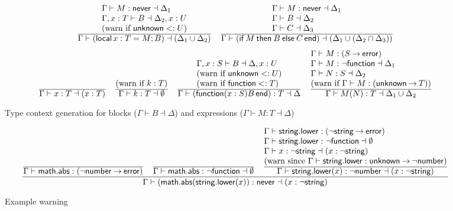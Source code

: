 \documentclass[sigplan]{acmart}
\makeatletter
\newcommand{\infer}[2]{\frac{\displaystyle\begin{array}{@{}l@{}}#1\end{array}}{\displaystyle#2}}
\newcommand{\LOCAL}{\mathop{\mathsf{local}}}
\newcommand{\FUNCTION}{\mathop{\mathsf{function}}}
\newcommand{\IF}{\mathop{\mathsf{if}}}
\newcommand{\THEN}{\mathbin{\mathsf{then}}}
\newcommand{\ELSE}{\mathbin{\mathsf{else}}}
\newcommand{\END}{\mathop{\mathsf{end}}}
\newcommand{\NEVER}{\mathsf{never}}
\newcommand{\ERROR}{\mathsf{error}}
\newcommand{\UNKNOWN}{\mathsf{unknown}}
\newcommand{\STRING}{\mathsf{string}}
\newcommand{\NUMBER}{\mathsf{number}}
\newcommand{\MATH}{\mathsf{math}}
\newcommand{\ABS}{\mathsf{abs}}
\newcommand{\LOWER}{\mathsf{lower}}
\newcommand{\fun}{\mathbin{\rightarrow}}
\makeatother
\begin{document}
\begin{figure}
  \[\begin{array}{c}
    \infer{
      \Gamma \vdash M : \NEVER \dashv \Delta_1 \\
      \Gamma, x : T \vdash B \dashv \Delta_2, x : U \\
      \mbox{(warn if $\UNKNOWN <: U$)}
    }{
      \Gamma \vdash (\LOCAL x : T = M; B) \dashv (\Delta_1 \cup \Delta_2)
    }
    \quad
    \infer{
      \Gamma \vdash M : \NEVER \dashv \Delta_1 \\
      \Gamma \vdash B \dashv \Delta_2 \\
      \Gamma \vdash C \dashv \Delta_3 
    }{
      \Gamma \vdash (\IF M \THEN B \ELSE C \END) \dashv (\Delta_1 \cup (\Delta_2 \cap \Delta_3))
    }
  \\[\bigskipamount]
    \infer{}{
      \Gamma \vdash x : T \dashv (x : T)
    }
    \quad
    \infer{
      \mbox{(warn if $k:T$)}
    }{
      \Gamma \vdash k : T \dashv \emptyset
    }
    \quad
    \infer{
      \Gamma, x:S \vdash B \dashv \Delta, x:U \\
      \mbox{(warn if $\UNKNOWN <: U$)}\\
      \mbox{(warn if ${\FUNCTION} <: T$)}
    }{
      \Gamma \vdash (\FUNCTION (x : S) B \END) : T \dashv \Delta
    }
    \quad
    \infer{
      \Gamma \vdash M : (S \fun \ERROR) \\
      \Gamma \vdash M : \neg{\FUNCTION} \dashv \Delta_1 \\
      \Gamma \vdash N : S \dashv \Delta_2  \\
      \mbox{(warn if $\Gamma \vdash M : (\UNKNOWN \fun T)$)}
    }{
      \Gamma \vdash M(N) : T \dashv \Delta_1 \cup \Delta_2
    }
  \end{array}\]
  \caption{Type context generation for blocks ($\Gamma \vdash B \dashv \Delta$) and expressions ($\Gamma \vdash M:T \dashv \Delta$)}
  \label{fig:ctxtgen}
\end{figure}

\begin{figure}
  \[
    \infer{
      \infer{}{\Gamma \vdash \MATH.\ABS : (\neg\NUMBER \fun \ERROR)} \quad
      \infer{}{\Gamma \vdash \MATH.\ABS : \neg{\FUNCTION} \dashv \emptyset} \quad
      \infer{
        \Gamma \vdash \STRING.\LOWER : (\neg\STRING \fun \ERROR) \\
        \Gamma \vdash \STRING.\LOWER : \neg{\FUNCTION} \dashv \emptyset \\
        \Gamma \vdash x : \neg{\STRING} \dashv (x : \neg\STRING) \\
        \mbox{(warn since $\Gamma \vdash \STRING.\LOWER : \UNKNOWN \fun \neg\NUMBER$)}
      }{\Gamma \vdash \STRING.\LOWER(x) : \neg{\NUMBER} \dashv (x : \neg\STRING)}
    }{\Gamma \vdash (\MATH.\ABS(\STRING.\LOWER(x)) : \NEVER \dashv (x : \neg\STRING)}
  \]
  \caption{Example warning}
  \label{fig:example}
\end{figure}
\end{document}
